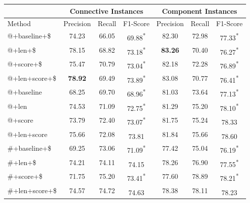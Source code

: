 \begin{table}[!htbp]
\centering
\begin{tabular}{|l|c|c|c|c|c|c|}
\hline
               & \multicolumn{3}{c|}{Connective Instances}                 & \multicolumn{3}{c|}{Component Instances}                  \\ \hline
Method         &     Precision &     Recall &     F1-Score                 &     Precision &     Recall &     F1-Score                 \\ \hline
@+baseline+\$  &     74.23     &     66.05  &     69.88\textsuperscript{*} &     82.30     &     72.98  &     77.33\textsuperscript{*} \\ \hline
@+len+\$       &     78.15     &     68.82  &     73.18\textsuperscript{*} & \bf 83.26     &     70.40  &     76.27\textsuperscript{*} \\ \hline
@+score+\$     &     75.47     &     70.79  &     73.04\textsuperscript{*} &     82.18     &     72.28  &     76.89\textsuperscript{*} \\ \hline
@+len+score+\$ & \bf 78.92     &     69.49  &     73.89\textsuperscript{*} &     83.08     &     70.77  &     76.41\textsuperscript{*} \\

\hhline{|=|=|=|=|=|=|=|}

@+baseline     &     68.25     &     69.70  &     68.96\textsuperscript{*} &     81.03     &     73.64  &     77.13\textsuperscript{*} \\ \hline
@+len          &     74.53     &     71.09  &     72.75\textsuperscript{*} &     81.29     &     75.20  &     78.10\textsuperscript{*} \\ \hline
@+score        &     73.79     &     72.40  &     73.07\textsuperscript{*} &     81.75     &     75.24  &     78.33\textsuperscript{ } \\ \hline
@+len+score    &     75.66     &     72.08  &     73.81\textsuperscript{ } &     81.84     &     75.66  &     78.60\textsuperscript{ } \\

\hhline{|=|=|=|=|=|=|=|}

\#+baseline+\$ &     69.25     &     73.06  &     71.09\textsuperscript{*} &     77.42     &     75.04  &     76.19\textsuperscript{*} \\ \hline
\#+len+\$      &     74.21     &     74.11  &     74.15\textsuperscript{ } &     78.26     &     76.90  &     77.55\textsuperscript{*} \\ \hline
\#+score+\$    &     71.75     &     75.20  &     73.41\textsuperscript{*} &     77.60     &     78.89  &     78.21\textsuperscript{*} \\ \hline
\#+len+score+\$&     74.57     &     74.72  &     74.63\textsuperscript{ } &     78.38     &     78.11  &     78.23\textsuperscript{ } \\


\end{tabular}
\end{table}
